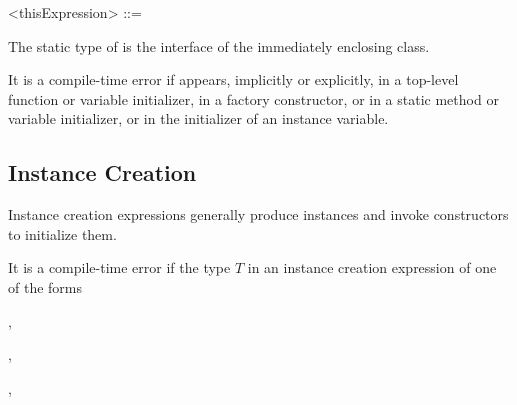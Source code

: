 \documentclass[makeidx]{article}
\begin{document}
{\begin{grammar}
<thisExpression> ::= \THIS{}
\end{grammar}

\LMHash{}%
The static type of \THIS{} is the interface of the immediately enclosing class.


\LMHash{}%
It is a compile-time error if \THIS{} appears, implicitly or explicitly, in a top-level function or variable initializer, in a factory constructor, or in a static method or variable initializer, or in the initializer of an instance variable.


\subsection{Instance Creation}

\LMHash{}%
Instance creation expressions generally produce instances
and invoke constructors to initialize them.




\LMHash{}%
It is a compile-time error if
the type $T$ in an instance creation expression of one of the forms

,

,

,

}
\end{document}
